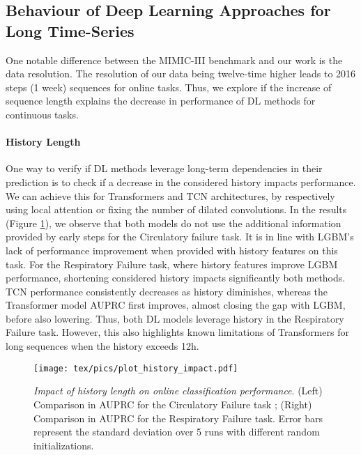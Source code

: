 \documentclass{article}
\begin{document}
\subsection{Behaviour of Deep Learning Approaches for Long Time-Series}
One notable difference between the MIMIC-III benchmark \cite{harutyunyan2019multitask} and our work is the data resolution. The resolution of our data being twelve-time higher leads to 2016 steps (1 week) sequences for online tasks. Thus, we explore if the increase of sequence length explains the decrease in performance of DL methods for continuous tasks.

\paragraph{History Length} One way to verify if DL methods leverage long-term dependencies in their prediction is to check if a decrease in the considered history impacts performance. We can achieve this for Transformers and TCN architectures, by respectively using local attention or fixing the number of dilated convolutions. In the results (Figure \ref{fig:ablation-history}), we observe that both models do not use the additional information provided by early steps for the Circulatory failure task. It is in line with LGBM's lack of performance improvement when provided with history features on this task. For the Respiratory Failure task, where history features improve LGBM performance, shortening considered history impacts significantly both methods. TCN performance consistently decreases as history diminishes, whereas the Transformer model AUPRC first improves, almost closing the gap with LGBM, before also lowering. Thus, both DL models leverage history in the Respiratory Failure task. However, this also highlights known limitations of Transformers for long sequences \cite{DBLP:journals/corr/abs-1904-10509} when the history exceeds 12h.

\begin{figure}[ht!]
    \centering
    \texttt{[image: tex/pics/plot\_history\_impact.pdf]}
    \caption{\textit{Impact of history length on online classification performance}. (Left) Comparison in AUPRC for the Circulatory Failure task ; (Right) Comparison in AUPRC for the Respiratory Failure task. Error bars represent the standard deviation over 5 runs with different random initializations.}
    \label{fig:ablation-history}
\end{figure}
\end{document}
